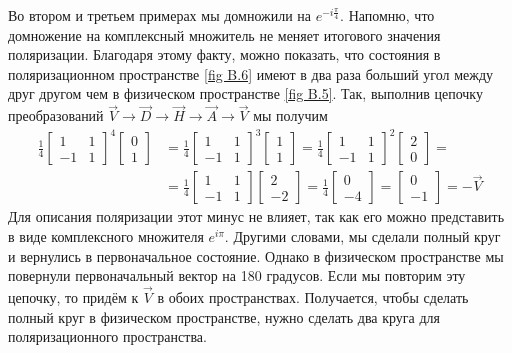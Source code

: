 Во втором и третьем примерах мы домножили на $e^{-i\frac{\pi}{4}}$. Напомню, что домножение на комплексный множитель не меняет итогового значения поляризации. Благодаря этому факту, можно показать, что состояния в поляризационном пространстве \ref{fig B.6} имеют в два раза больший угол между друг другом чем в физическом пространстве \ref{fig B.5}. Так, выполнив цепочку преобразований $\vec{V} \rightarrow \vec{D} \rightarrow \vec{H} \rightarrow \vec{A} \rightarrow \vec{V}$ мы получим
\begin{align*}
\frac{1}{4}\begin{bmatrix} 1 & 1 \\ -1 & 1 \end{bmatrix}^4\begin{bmatrix} 0 \\ 1 \end{bmatrix} &= \frac{1}{4}\begin{bmatrix} 1 & 1 \\ -1 & 1 \end{bmatrix}^3\begin{bmatrix} 1 \\ 1 \end{bmatrix} = \frac{1}{4}\begin{bmatrix} 1 & 1 \\ -1 & 1 \end{bmatrix}^2\begin{bmatrix} 2 \\ 0 \end{bmatrix} = \\
&=\frac{1}{4}\begin{bmatrix} 1 & 1 \\ -1 & 1 \end{bmatrix}\begin{bmatrix} 2 \\ -2 \end{bmatrix} = \frac{1}{4}\begin{bmatrix} 0 \\ -4 \end{bmatrix} = \begin{bmatrix} 0 \\ -1 \end{bmatrix} = -\vec{V}
\end{align*}
Для описания поляризации этот минус не влияет, так как его можно представить в виде комплексного множителя $e^{i\pi}$. Другими словами, мы сделали полный круг и вернулись в первоначальное состояние. Однако в физическом пространстве мы повернули первоначальный вектор на 180 градусов. Если мы повторим эту цепочку, то придём к $\vec{V}$ в обоих пространствах. Получается, чтобы сделать полный круг в физическом пространстве, нужно сделать два круга для поляризационного пространства. 

